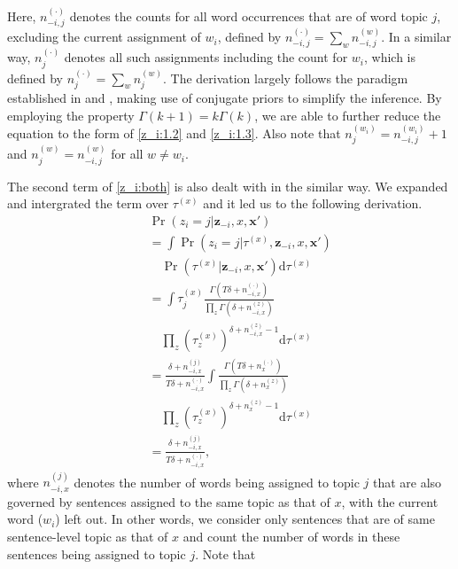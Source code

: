 Here, $n_{-i,j}^{(\cdot)}$ denotes the counts for all word occurrences that are
of word topic $j$, excluding the current assignment of $w_i$, defined by
$n_{-i,j}^{(\cdot)} = \sum_w n_{-i,j}^{(w)}$.  In a similar way,
$n_j^{(\cdot)}$ denotes all such assignments including the count for $w_i$,
which is defined by $n_j^{(\cdot)} = \sum_w n_j^{(w)}$.  The derivation largely
follows the paradigm established in \cite{blei2003latent} and \cite{griffiths2004finding}, making
use of conjugate priors to simplify the inference.  By employing the property
$\Gamma(k + 1) = k \Gamma(k)$, we are able to further reduce the equation to
the form of \eqref{z_i:1.2} and \eqref{z_i:1.3}.  Also note that $n_j^{(w_i)} =
n_{-i,j}^{(w_i)} + 1$ and $n_j^{(w)} = n_{-i,j}^{(w)}$ for all $w \ne w_i$.

The second term of \eqref{z_i:both} is also dealt with in the similar way. We expanded and intergrated the term over $\tau^{(x)}$ and it led us to the following derivation.
\begin{eqnarray}
  && \Pr(z_i = j|\mathbf{z}_{-i}, x, \mathbf{x}') \nonumber \\
  && = \int \Pr(z_i = j|\tau^{(x)}, \mathbf{z}_{-i}, x, \mathbf{x}') \nonumber\\
  && \quad \Pr(\tau^{(x)}|\mathbf{z}_{-i}, x, \mathbf{x}')\mathrm{d}\tau^{(x)} \nonumber \\
  && = \int \tau_j^{(x)} \frac{\Gamma(T \delta + n_{-i,x}^{(\cdot)})}{\prod_z \Gamma(\delta + n_{-i,x}^{(z)})} \nonumber\\
  && \quad \prod_z \left(\tau^{(x)}_z\right)^{\delta + n_{-i,x}^{(z)} - 1} \mathrm{d}\tau^{(x)} \label{z_i:2.1} \\
  && = \frac{\delta + n_{-i,x}^{(j)}}{T \delta + n_{-i,x}^{(\cdot)}} \int \frac{\Gamma(T \delta + n_x^{(\cdot)})}{\prod_z \Gamma(\delta + n_x^{(z)})} \nonumber\\
  && \quad \prod_z \left(\tau^{(x)}_z\right)^{\delta + n_x^{(z)} - 1} \mathrm{d}\tau^{(x)} \label{z_i:2.2} \\
  && = \frac{\delta + n_{-i,x}^{(j)}}{T \delta + n_{-i,x}^{(\cdot)}}, \label{z_i:2.3}
\end{eqnarray}
where $n_{-i,x}^{(j)}$ denotes the number of words being assigned to topic $j$
that are also governed by sentences assigned to the same topic as that of $x$,
with the current word ($w_i$) left out.  In other words, we consider only
sentences that are of same sentence-level topic as that of $x$ and count the
number of words in these sentences being assigned to topic $j$.  Note that
